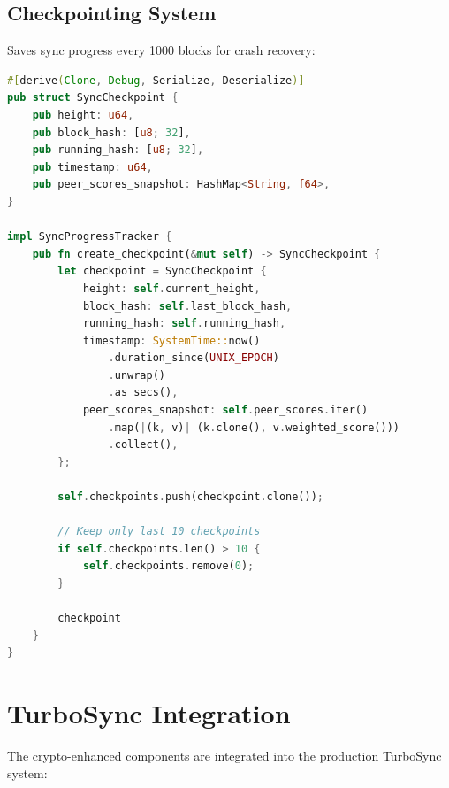 \documentclass[11pt,a4paper]{article}
\begin{document}
\subsection{Checkpointing System}

Saves sync progress every 1000 blocks for crash recovery:

\begin{lstlisting}[language=Rust, caption=Sync Checkpointing]
#[derive(Clone, Debug, Serialize, Deserialize)]
pub struct SyncCheckpoint {
    pub height: u64,
    pub block_hash: [u8; 32],
    pub running_hash: [u8; 32],
    pub timestamp: u64,
    pub peer_scores_snapshot: HashMap<String, f64>,
}

impl SyncProgressTracker {
    pub fn create_checkpoint(&mut self) -> SyncCheckpoint {
        let checkpoint = SyncCheckpoint {
            height: self.current_height,
            block_hash: self.last_block_hash,
            running_hash: self.running_hash,
            timestamp: SystemTime::now()
                .duration_since(UNIX_EPOCH)
                .unwrap()
                .as_secs(),
            peer_scores_snapshot: self.peer_scores.iter()
                .map(|(k, v)| (k.clone(), v.weighted_score()))
                .collect(),
        };

        self.checkpoints.push(checkpoint.clone());

        // Keep only last 10 checkpoints
        if self.checkpoints.len() > 10 {
            self.checkpoints.remove(0);
        }

        checkpoint
    }
}
\end{lstlisting}

\section{TurboSync Integration}

The crypto-enhanced components are integrated into the production TurboSync system:
\end{document}

